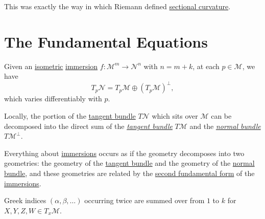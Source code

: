 \begin{remark}
	This was exactly the way in which Riemann defined \hyperref[def:sectional-curvature]{sectional curvature}.
\end{remark}

\section{The Fundamental Equations}
Given an \hyperref[def:isometry]{isometric} \hyperref[def:immersion]{immersion} \(f\colon \mathcal{M} ^m \to \mathcal{N} ^n\) with \(n = m + k\), at each \(p\in \mathcal{M} \), we have
\[
	T_p \mathcal{N} = T_p \mathcal{M} \oplus (T_p \mathcal{M} ) ^{\perp},
\]
which varies differentiably with \(p\).

\begin{intuition}
	Locally, the portion of the \hyperref[def:tangent-bundle]{tangent bundle} \(T \mathcal{N} \) which sits over \(\mathcal{M} \) can be decomposed into the direct sum of the \emph{\hyperref[def:tangent-bundle]{tangent bundle}} \(T \mathcal{M} \) and the \emph{\hyperref[not:normal-bundle]{normal bundle}} \(T \mathcal{M} ^{\perp} \).
\end{intuition}

Everything about \hyperref[def:immersion]{immersions} occurs as if the geometry decomposes into two geometries: the geometry of the \hyperref[def:tangent-bundle]{tangent bundle} and the geometry of the \hyperref[not:normal-bundle]{normal bundle}, and these geometries are related by the \hyperref[def:2nd-fundamental-form]{second fundamental form} of the \hyperref[def:immersion]{immersions}.

\begin{notation}
	Greek indices \((\alpha , \beta , \dots )\) occurring twice are summed over from \(1\) to \(k\) for \(X, Y, Z, W \in T_x \mathcal{M} \).
\end{notation}

